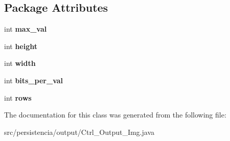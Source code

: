\subsection*{Package Attributes}
\begin{DoxyCompactItemize}
\item 
\mbox{\label{classpersistencia_1_1output_1_1Ctrl__Output__Img_ab9e685dae026afe43188c62d7c4fad53}} 
int {\bfseries max\+\_\+val}
\item 
\mbox{\label{classpersistencia_1_1output_1_1Ctrl__Output__Img_a1d7bc52c64c79e8545ae6d1ae8b9ee2e}} 
int {\bfseries height}
\item 
\mbox{\label{classpersistencia_1_1output_1_1Ctrl__Output__Img_ae4a01ec459078cece4815d2fe7db8a64}} 
int {\bfseries width}
\item 
\mbox{\label{classpersistencia_1_1output_1_1Ctrl__Output__Img_ad40e63d16abd9058889249f5ad84f200}} 
int {\bfseries bits\+\_\+per\+\_\+val}
\item 
\mbox{\label{classpersistencia_1_1output_1_1Ctrl__Output__Img_a586ee8128a26b6786471e040a705bdbc}} 
int {\bfseries rows}
\end{DoxyCompactItemize}


The documentation for this class was generated from the following file\+:\begin{DoxyCompactItemize}
\item 
src/persistencia/output/Ctrl\+\_\+\+Output\+\_\+\+Img.\+java\end{DoxyCompactItemize}
